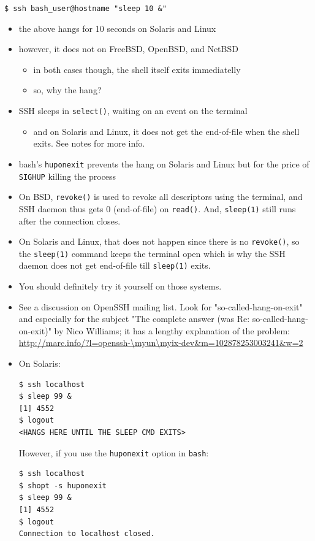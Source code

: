 \texttt{\$ ssh bash\_user@hostname "sleep 10 \&"}

\begin{itemize}
\item the above hangs for 10 seconds on Solaris and Linux
\item however, it does not on FreeBSD, OpenBSD, and NetBSD
\begin{itemize}
	\item in both cases though, the shell itself exits immediatelly
	\item so, why the hang?
\end{itemize}

\item SSH sleeps in \texttt{select()}, waiting on an event on the terminal
\begin{itemize}
	\item and on Solaris and Linux, it does not get the end-of-file when the
	shell exits. See notes for more info.
\end{itemize}

\item bash's \texttt{huponexit} prevents the hang on Solaris and Linux but for
the price of \texttt{SIGHUP} killing the process
\end{itemize}

\begin{itemize}
\item On BSD, \texttt{revoke()} is used to revoke all descriptors using the
terminal, and SSH daemon thus gets 0 (end-of-file) on \texttt{read()}. And,
\texttt{sleep(1)} still runs after the connection closes.
\item On Solaris and Linux, that does not happen since there is no
\texttt{revoke()}, so the \texttt{sleep(1)} command keeps the terminal open
which is why the SSH daemon does not get end-of-file till \texttt{sleep(1)}
exits.
\item You should definitely try it yourself on those systems.
\item See a discussion on OpenSSH mailing list. Look for
"so-called-hang-on-exit" and especially for the subject "The complete answer
(was Re: so-called-hang-on-exit)" by Nico Williams; it has a lengthy
explanation of the problem:\\
\url{http://marc.info/?l=openssh-\myun\myix-dev&m=102878253003241&w=2}
\item On Solaris:
\begin{verbatim}
$ ssh localhost
$ sleep 99 &
[1] 4552
$ logout
<HANGS HERE UNTIL THE SLEEP CMD EXITS>
\end{verbatim}

However, if you use the \texttt{huponexit} option in \texttt{bash}:

\begin{verbatim}
$ ssh localhost
$ shopt -s huponexit
$ sleep 99 &
[1] 4552
$ logout
Connection to localhost closed.
\end{verbatim}
\end{itemize}

